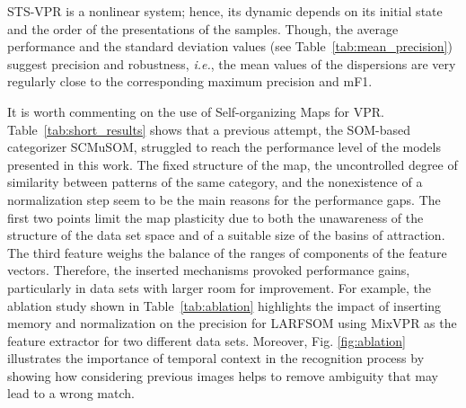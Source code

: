 \documentclass[letterpaper, 10 pt, conference]{ieeeconf}  %
\begin{document}


STS-VPR is a nonlinear system; hence, its dynamic depends on its initial state and the order of the presentations of the samples. Though, the average performance and the standard deviation values (see Table~\ref{tab:mean_precision}) suggest precision and robustness, \textit{i.e.}, the mean values of the dispersions are very regularly close to the corresponding maximum precision and mF1.

It is worth commenting on the use of Self-organizing Maps for VPR. Table~\ref{tab:short_results} shows that a previous attempt, the SOM-based categorizer SCMuSOM, struggled to reach the performance level of the models presented in this work. The fixed structure of the map, the uncontrolled degree of similarity between patterns of the same category, and the nonexistence of a normalization step seem to be the main reasons for the performance gaps. The first two points limit the map plasticity due to both the unawareness of the structure of the data set space and of a suitable size of the basins of attraction. The third feature weighs the balance of the ranges of components of the feature vectors. Therefore, the inserted mechanisms provoked performance gains, particularly in data sets with larger room for improvement. 
For example, the ablation study shown in Table~\ref{tab:ablation} highlights the impact of inserting memory and normalization on the precision for LARFSOM using MixVPR as the feature extractor for two different data sets. Moreover, Fig. \ref{fig:ablation} illustrates the importance of temporal context in the recognition process by showing how considering previous images helps to remove ambiguity that may lead to a wrong match.
\end{document}
